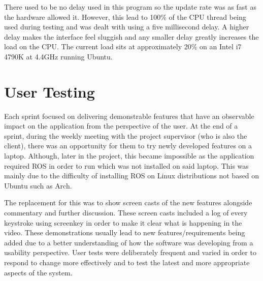 There used to be no delay used in this program so the update rate was as fast as the hardware allowed it. However, this lead to 100\% of the CPU thread being used during testing and was dealt with using a five millisecond delay. A higher delay makes the interface feel sluggish and any smaller delay greatly increases the load on the CPU. The current load sits at approximately 20\% on an {\selectfont Intel i7 4790K} at {\selectfont 4.4GHz} running {\selectfont Ubuntu}.

\section{User Testing}

Each sprint focused on delivering demonstrable features that have an observable impact on the application from the perspective of the user. At the end of a sprint, during the weekly meeting with the project supervisor (who is also the client), there was an opportunity for them to try newly developed features on a laptop. Although, later in the project, this became impossible as the application required {\selectfont ROS} in order to run which was not installed on said laptop. This was mainly due to the difficulty of installing {\selectfont ROS} on Linux distributions not based on {\selectfont Ubuntu} such as {\selectfont Arch}.

The replacement for this was to show screen casts of the new features alongside commentary and further discussion. These screen casts included a log of every keystroke using {\selectfont screenkey}\cite{screenkey} in order to make it clear what is happening in the video. These demonstrations usually lead to new features/requirements being added due to a better understanding of how the software was developing from a usability perspective. User tests were deliberately frequent and varied in order to respond to change more effectively and to test the latest and more appropriate aspects of the system.

